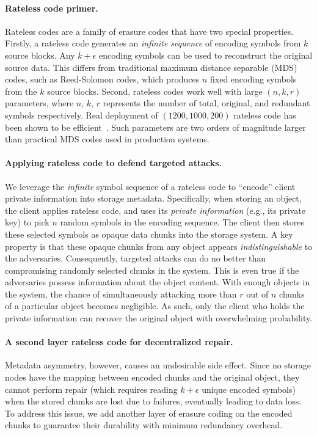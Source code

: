 \paragraph{\textbf{Rateless code primer.}}
Rateless codes are a family of erasure codes that have two special properties.
Firstly, a rateless code generates an \emph{infinite sequence} of encoding symbols from $k$ source blocks.
Any $k+\epsilon$ encoding symbols can be used to reconstruct the original source data.
This differs from traditional maximum distance separable (MDS) codes, such as Reed-Solomon codes, which produces $n$ fixed encoding symbols from the $k$ source blocks.
Second, rateless codes work well with large $(n, k, r)$ parameters, where $n$, $k$, $r$ represents the number of total, original, and redundant symbols respectively.
Real deployment of $(1200, 1000, 200)$ rateless code has been shown to be efficient~\cite{liquid}.
Such parameters are two orders of magnitude larger than practical MDS codes used in production systems.

\paragraph{\textbf{Applying rateless code to defend targeted attacks.}}
We leverage the \emph{infinite} symbol sequence of a rateless code to ``encode'' client private information into storage metadata.
Specifically, when storing an object, the client applies rateless code, and uses its \emph{private information} (e.g., its private key) to pick $n$ random symbols in the encoding sequence.
The client then stores these selected symbols as opaque data chunks into the storage system.
A key property is that these opaque chunks from any object appears \emph{indistinguishable} to the adversaries.
Consequently, targeted attacks can do no better than compromising randomly selected chunks in the system.
This is even true if the adversaries possess information about the object content.
With enough objects in the system, the chance of simultaneously attacking more than $r$ out of $n$ chunks of a particular object becomes negligible.
As such, only the client who holds the private information can recover the original object with overwhelming probability.

\paragraph{\textbf{A second layer rateless code for decentralized repair.}}
Metadata asymmetry, however, causes an undesirable side effect.
Since no storage nodes have the mapping between encoded chunks and the original object, they cannot perform repair (which requires reading $k+\epsilon$ unique encoded symbols) when the stored chunks are lost due to failures, eventually leading to data loss.
To address this issue, we add another layer of erasure coding on the encoded chunks to guarantee their durability with minimum redundancy overhead.

